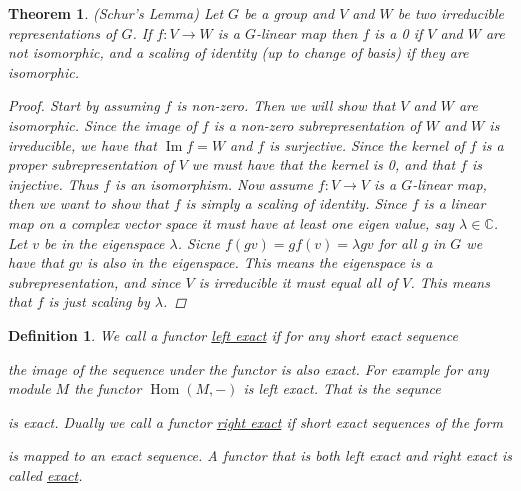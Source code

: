 \documentclass[11pt, a4paper, english]{article}
\numberwithin{prop}{section}
\numberwithin{lemma}{section}
\newtheorem{theorem}{Theorem}
\numberwithin{theorem}{section}
\newtheorem{defin}{Definition}
\numberwithin{defin}{section}
\numberwithin{example}{section}
\newcommand{\C}{\mathbb{C}}
\DeclareMathOperator{\Hom}{Hom}
\DeclareMathOperator{\Image}{Im}
\begin{document}
\begin{appendices}
\begin{theorem}
\label{schur}
(Schur's Lemma) Let $G$ be a group and $V$ and $W$ be two irreducible representations of $G$. If $f:V \to W$ is a $G$-linear map then $f$ is a 0 if $V$ and $W$ are not isomorphic, and a scaling of identity (up to change of basis) if they are isomorphic.
\begin{proof}
Start by assuming $f$ is non-zero. Then we will show that $V$ and $W$ are isomorphic. Since the image of $f$ is a non-zero subrepresentation of $W$ and $W$ is irreducible, we have that $\Image f = W$ and $f$ is surjective. Since the kernel of $f$ is a proper subrepresentation of $V$ we must have that the kernel is 0, and that $f$ is injective. Thus $f$ is an isomorphism.
Now assume $f: V \to V$ is a $G$-linear map, then we want to show that $f$ is simply a scaling of identity. Since $f$ is a linear map on a complex vector space it must have at least one eigen value, say $\lambda \in \C$. Let $v$ be in the eigenspace $\lambda$. Sicne $f(gv) = g f(v) = \lambda gv$ for all $g$ in $G$ we have that $gv$ is also in the eigenspace. This means the eigenspace is a subrepresentation, and since $V$ is irreducible it must equal all of $V$. This means that $f$ is just scaling by $\lambda$.
\end{proof}
\end{theorem}

\begin{defin}
We call a functor \underline{left exact} if for any short exact sequence
\begin{center}
\end{center}
the image of the sequence under the functor is also exact. For example for any module $M$ the functor $\Hom(M, -)$ is left exact. That is the sequnce
\begin{center}
\end{center}
is exact. Dually we call a functor \underline{right exact} if short exact sequences of the form
\begin{center}
\end{center}
is mapped to an exact sequence. A functor that is both left exact and right exact is called \underline{exact}.
\end{defin}


\end{appendices}
\end{document}
